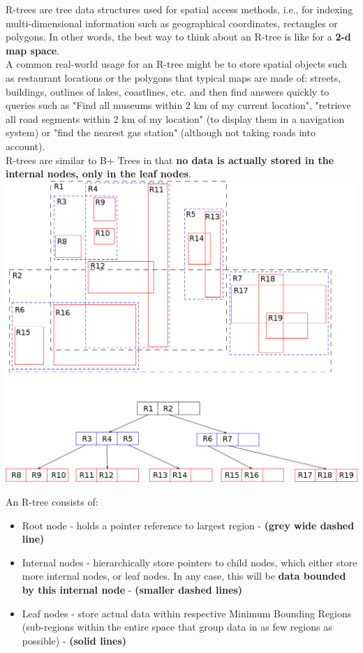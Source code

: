\documentclass[english, 10pt]{article}
\begin{document}
\hfill

\begin{tcolorbox}[title=Aside: R-tree,colframe=black,colback=white,arc=0pt,fonttitle=\bfseries,breakable]

R-trees are tree data structures used for spatial access methods, i.e., for indexing multi-dimensional information such as geographical coordinates, rectangles or polygons. In other words, the best way to think about an R-tree is like for a \textbf{2-d map space}.\\

A common real-world usage for an R-tree might be to store spatial objects such as restaurant locations or the polygons that typical maps are made of: streets, buildings, outlines of lakes, coastlines, etc. and then find answers quickly to queries such as "Find all museums within 2 km of my current location", "retrieve all road segments within 2 km of my location" (to display them in a navigation system) or "find the nearest gas station" (although not taking roads into account).\\
 
R-trees are similar to B+ Trees in that {\textbf{no data is actually stored in the internal nodes, only in the leaf nodes}}.\\

\includegraphics[scale=0.4]{img/rtree.png} 

\hfill \break An R-tree consists of:
\begin{itemize}
	\item Root node - holds a pointer reference to largest region - \textbf{(grey  wide dashed line)}
	\item Internal nodes - hierarchically store pointers to child nodes, which either store more internal nodes, or leaf nodes. In any case, this will be \textbf{data bounded by this internal node} - \textbf{(smaller dashed lines)}
	\item Leaf nodes - store actual data within respective Minimum Bounding Regions (sub-regions within the entire space that group data in as few regions as possible) - \textbf{(solid lines)}
\end{itemize}


\end{tcolorbox}
\end{document}
